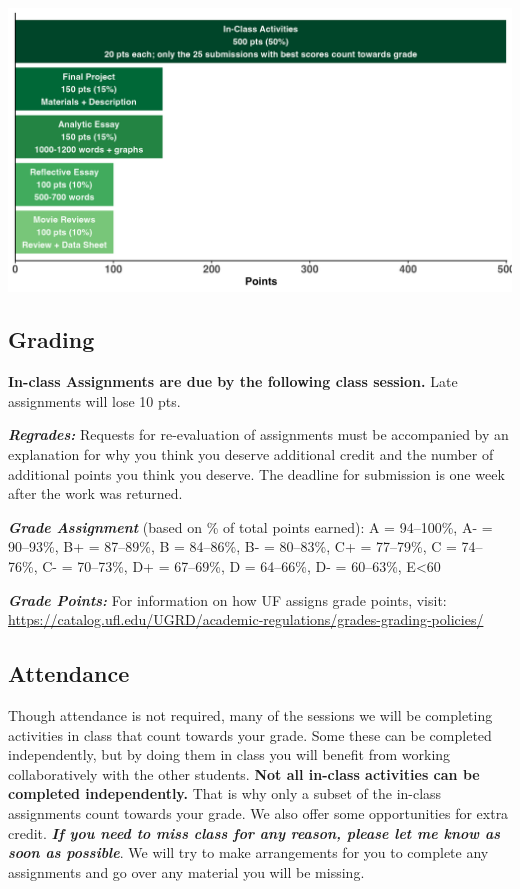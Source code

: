 \documentclass[
  10pt,
  letterpaper,
  oneside,
  open=any]{scrbook}
\begin{document}
\begin{center}
\includegraphics[width=1\linewidth,height=\textheight,keepaspectratio]{images/hw.png}
\end{center}

\subsection*{Grading}\label{grading}

\textbf{In-class Assignments are due by the following class session.}
Late assignments will lose 10 pts.

\textbf{\emph{Regrades:}} Requests for re-evaluation of assignments must
be accompanied by an explanation for why you think you deserve
additional credit and the number of additional points you think you
deserve. The deadline for submission is one week after the work was
returned.

\textbf{\emph{Grade Assignment}} (based on \% of total points earned): A
= 94--100\%, A- = 90--93\%, B+ = 87--89\%, B = 84--86\%, B- = 80--83\%,
C+ = 77--79\%, C = 74--76\%, C- = 70--73\%, D+ = 67--69\%, D = 64--66\%,
D- = 60--63\%, E\textless60

\textbf{\emph{Grade Points:}} For information on how UF assigns grade
points, visit:
\url{https://catalog.ufl.edu/UGRD/academic-regulations/grades-grading-policies/}

\subsection*{Attendance}\label{attendance}

Though attendance is not required, many of the sessions we will be
completing activities in class that count towards your grade. Some these
can be completed independently, but by doing them in class you will
benefit from working collaboratively with the other students.
\textbf{Not all in-class activities can be completed independently.}
That is why only a subset of the in-class assignments count towards your
grade. We also offer some opportunities for extra credit.
\textbf{\emph{If you need to miss class for any reason, please let me
know as soon as possible}}. We will try to make arrangements for you to
complete any assignments and go over any material you will be missing.
\end{document}
